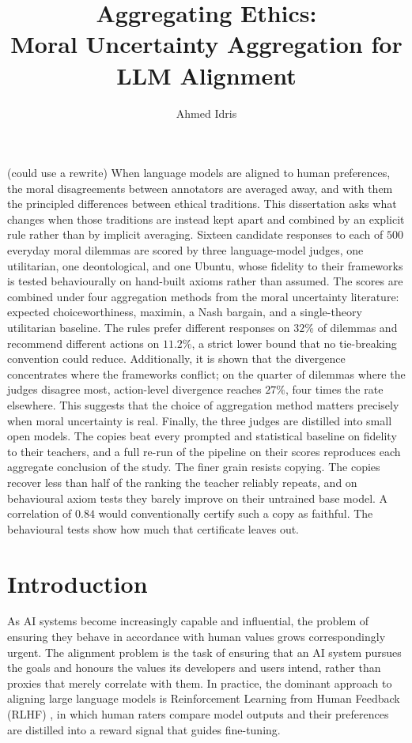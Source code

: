\documentclass[10pt,twocolumn,a4paper]{article}
\title{\textbf{Aggregating Ethics:}\\ Moral Uncertainty Aggregation for LLM Alignment}
\author{Ahmed Idris}
\date{}
\renewenvironment{abstract}{%
  \begin{center}\textbf{\large\abstractname}\end{center}%
  \vspace{2pt}%
}{\vspace{4pt}}
\begin{document}
\raggedbottom
\maketitle

\begin{abstract}
\noindent
(could use a rewrite)
When language models are aligned to human preferences, the moral
disagreements between annotators are averaged away, and with them the
principled differences between ethical traditions. This dissertation asks
what changes when those traditions are instead kept apart and combined by
an explicit rule rather than by implicit averaging. Sixteen
candidate responses to each of $500$ everyday moral dilemmas are scored
by three language-model judges, one utilitarian, one deontological, and
one Ubuntu, whose fidelity to their frameworks is tested behaviourally
on hand-built axioms rather than assumed. The scores are combined under
four aggregation methods from the moral uncertainty literature: expected
choiceworthiness, maximin, a Nash bargain, and a single-theory
utilitarian baseline. The rules prefer
different responses on $32\%$ of dilemmas and recommend different
actions on $11.2\%$, a strict lower bound that no tie-breaking
convention could reduce. Additionally, it is shown that the divergence concentrates where the
frameworks conflict; on the quarter of dilemmas where the judges disagree
most, action-level divergence reaches $27\%$, four times the rate
elsewhere. This suggests that the choice of aggregation method matters precisely when moral
uncertainty is real. Finally, the three judges are distilled into small
open models. The copies beat every prompted and statistical baseline on
fidelity to their teachers, and a full re-run of the pipeline on their
scores reproduces each aggregate conclusion of the study. The finer
grain resists copying. The copies recover less than half of the ranking
the teacher reliably repeats, and on behavioural axiom tests they barely
improve on their untrained base model. A correlation of $0.84$ would
conventionally certify such a copy as faithful. The behavioural tests
show how much that certificate leaves out. 
\end{abstract}

\section{Introduction}

As AI systems become increasingly capable and influential, the problem of
ensuring they behave in accordance with human values grows correspondingly
urgent. The alignment problem \cite{christian2020} is the task of ensuring
that an AI system pursues the goals and honours the values its developers
and users intend, rather than proxies that merely correlate with them. In
practice, the dominant approach to aligning large language models is
Reinforcement Learning from Human Feedback (RLHF) \cite{ouyang2022}, in
which human raters compare model outputs and their preferences are
distilled into a reward signal that guides fine-tuning.
\end{document}

